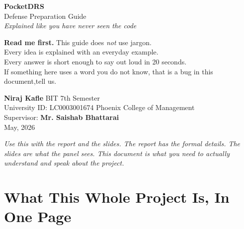 \documentclass[11pt,a4paper]{article}
\begin{document}
\begin{titlepage}
\begin{center}
\vspace*{1.2cm}
{\Huge\bfseries\color{NavyTint} PocketDRS}\\[10pt]
{\Large Defense Preparation Guide}\\[4pt]
{\large \textit{Explained like you have never seen the code}}\\[34pt]

\noindent\colorbox{MutedBg}{%
  \begin{minipage}{0.86\textwidth}\setlength{\parskip}{4pt}\vspace{6pt}
    \textbf{Read me first.} This guide does \emph{not} use jargon.\\
    Every idea is explained with an everyday example.\\
    Every answer is short enough to say out loud in 20 seconds.\\
    If something here uses a word you do not know, that is a bug in this document,tell us.
    \vspace{6pt}
  \end{minipage}}

\vspace{30pt}

\noindent\colorbox{MutedBg}{%
  \begin{minipage}{0.86\textwidth}\setlength{\parskip}{4pt}\vspace{6pt}
    \textbf{Niraj Kafle} \hfill BIT 7th Semester\\
    University ID: LC0003001674 \hfill Phoenix College of Management\\
    Supervisor: \textbf{Mr. Saishab Bhattarai}\\
    May, 2026
    \vspace{6pt}
  \end{minipage}}

\vfill
\textit{Use this with the report and the slides. The report has the formal details.
The slides are what the panel sees. \emph{This} document is what \emph{you} need to actually understand and speak about the project.}

\end{center}
\end{titlepage}

\tableofcontents
\newpage

\section{What This Whole Project Is, In One Page}
\end{document}
